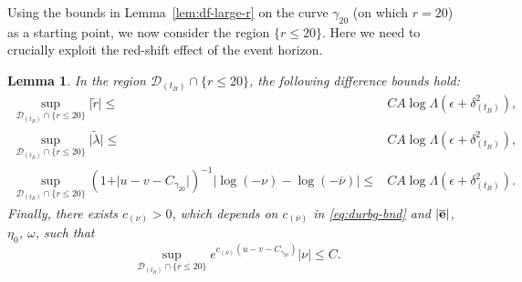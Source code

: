 \documentclass[10pt, reqno]{amsart}
\newtheorem{lemma}[theorem]{Lemma}
\theoremstyle{definition}
\theoremstyle{remark}
\theoremstyle{conjecture}
\numberwithin{equation}{section}
\newcommand{\abs}[1]{\vert#1\vert}
\newcommand{\set}[1]{\{#1\}}
\newcommand{\0}{\emptyset}
\newcommand{\gmm}{\gamma}
\newcommand{\dlt}{\delta}
\newcommand{\eps}{\epsilon}
\newcommand{\lmb}{\lambda}
\newcommand{\Lmb}{\Lambda}
\newcommand{\omg}{\omega}
\newcommand{\bfe}{{\bf e}}
\newcommand{\calD}{\mathcal D}
\newcommand{\dur}{\nu}
\newcommand{\dvr}{\lmb}
\newcommand{\e}{\bfe}							%
\newcommand{\dvrbg}{\overline{\dvr}}				%
\newcommand{\durbg}{\overline{\dur}}				%
\newcommand{\rbg}{\overline{r}}					%
\newcommand{\ebg}{\overline{\e}}					%
\newcommand{\dvrdf}{\widetilde{\dvr}}				%
\newcommand{\rdf}{\widetilde{r}}					%
\begin{document}
Using the bounds in Lemma~\ref{lem:df-large-r} on the curve $\gmm_{20}$ (on which $r = 20$) as a starting point, we now consider the region $\set{r \leq 20}$. Here we need to crucially exploit the red-shift effect of the event horizon.
\begin{lemma} \label{lem:df-small-r}
In the region $\calD_{(t_{B})} \cap \set{r \leq 20}$, the following difference bounds hold:
\begin{align} 
	\sup_{\calD_{(t_{B})} \cap \set{r \leq 20}} \abs{\rdf} 
\leq & 	C A \log \Lmb \left( \eps + \dlt_{(t_{B})}^{2}\right),				\label{eq:df-small-r:rdf} \\
	\sup_{\calD_{(t_{B})} \cap \set{r \leq 20}} \abs{\dvrdf} 
\leq & 	C A \log \Lmb \left( \eps + \dlt_{(t_{B})}^{2} \right),				\label{eq:df-small-r:dvrdf} \\
	\sup_{\calD_{(t_{B})} \cap \set{r \leq 20}} (1+\abs{u - v - C_{\gmm_{20}}})^{-1} \abs{\log (-\dur) - \log (-\durbg)} 
\leq & 	C A \log \Lmb  \left( \eps + \dlt_{(t_{B})}^{2}\right).				\label{eq:df-small-r:logdurdf} 
\end{align}
Finally, there exists $c_{(\dur)} > 0$, which depends on $c_{(\durbg)}$ in \eqref{eq:durbg-bnd} and $|\ebg|$, $\eta_0$, $\omg$, such that
\begin{equation} \label{eq:df-small-r:dur} 
	\sup_{\calD_{(t_{B})} \cap \set{r \leq 20}} e^{c_{(\dur)} (u - v - C_{\gmm_{20}})} \abs{\dur} 
\leq  	C. 					
\end{equation}
\end{lemma}
\end{document}
